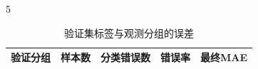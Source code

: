 \begin{PaperTable}{5}

\begin{table}[!htbp]
\centering\caption{验证集标签与观测分组的误差\label{q3-tab12}}
\begin{tabular}{@{}lllll@{}}
\toprule
\begin{minipage}[b]{\dimexpr 0.320000\linewidth-2.560000\tabcolsep\relax}\raggedright
验证分组\strut
\end{minipage} & \begin{minipage}[b]{\dimexpr 0.150000\linewidth-1.200000\tabcolsep\relax}\raggedleft
样本数\strut
\end{minipage} & \begin{minipage}[b]{\dimexpr 0.190000\linewidth-1.520000\tabcolsep\relax}\raggedleft
分类错误数\strut
\end{minipage} & \begin{minipage}[b]{\dimexpr 0.170000\linewidth-1.360000\tabcolsep\relax}\raggedleft
错误率\strut
\end{minipage} & \begin{minipage}[b]{\dimexpr 0.170000\linewidth-1.360000\tabcolsep\relax}\raggedleft
最终MAE\strut
\end{minipage}\tabularnewline
\midrule


\end{tabular}
\end{table}
\end{PaperTable}
